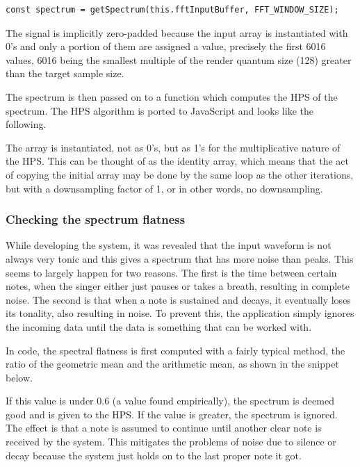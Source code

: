 \begin{lstlisting}[style=javascript]
    const spectrum = getSpectrum(this.fftInputBuffer, FFT_WINDOW_SIZE);
\end{lstlisting}

The signal is implicitly zero-padded because the input array is instantiated with 0's and only a portion of them are assigned a value, precisely the first 6016 values, 6016 being the smallest multiple of the render quantum size (128) greater than the target sample size.

The spectrum is then passed on to a function which computes the HPS of the spectrum. The HPS algorithm is ported to JavaScript and looks like the following. 



The array is instantiated, not as 0's, but as 1's for the multiplicative nature of the HPS. This can be thought of as the identity array, which means that the act of copying the initial array may be done by the same loop as the other iterations, but with a downsampling factor of 1, or in other words, no downsampling.

\subsubsection{Checking the spectrum flatness}
While developing the system, it was revealed that the input waveform is not always very tonic and this gives a spectrum that has more noise than peaks. This seems to largely happen for two reasons. The first is the time between certain notes, when the singer either just pauses or takes a breath, resulting in complete noise. The second is that when a note is sustained and decays, it eventually loses its tonality, also resulting in noise. To prevent this, the application simply ignores the incoming data until the data is something that can be worked with. 

In code, the spectral flatness is first computed with a fairly typical method, the ratio of the geometric mean and the arithmetic mean, as shown in the snippet below.



If this value is under $0.6$ (a value found empirically), the spectrum is deemed good and is given to the HPS. If the value is greater, the spectrum is ignored. The effect is that a note is assumed to continue until another clear note is received by the system. This mitigates the problems of noise due to silence or decay because the system just holds on to the last proper note it got. 


